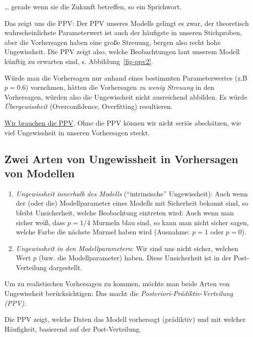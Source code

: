 \documentclass[
  a4paper,
  DIV=11]{scrreprt}
\theoremstyle{definition}
\theoremstyle{remark}
\begin{document}
\ldots{} gerade wenn sie die Zukunft betreffen, so ein Sprichwort.

Das zeigt uns die PPV: Der PPV unseres Modells gelingt es zwar, der
theoretisch wahrscheinlichste Parameterwert ist auch der häufigste in
unseren Stichproben, aber die Vorhersagen haben eine große Streuung,
bergen also recht hohe Ungewissheit. Die PPV zeigt also, welche
Beobachtungen laut unserem Modell künftig zu erwarten sind, s.
Abbildung~\ref{fig-ppv2}.

Würde man die Vorhersagen nur anhand eines bestimmten Parameterwertes
(z.B \(p=0.6\)) vornehmen, hätten die Vorhersagen \emph{zu wenig
Streuung} in den Vorhersagen, würden also die Ungewissheit nicht
ausreichend abbilden. Es würde \emph{Übergewissheit} (Overconfidence,
Overfitting) resultieren.

\href{https://imgflip.com/i/6zm1hh}{Wir brauchen die PPV}. Ohne die PPV
können wir nicht seriös abschätzen, wie viel Ungewissheit in unseren
Vorhersagen steckt.

\hypertarget{zwei-arten-von-ungewissheit-in-vorhersagen-von-modellen}{%
\subsection{Zwei Arten von Ungewissheit in Vorhersagen von
Modellen}\label{zwei-arten-von-ungewissheit-in-vorhersagen-von-modellen}}

\begin{enumerate}
\def\labelenumi{\arabic{enumi}.}
\item
  \emph{Ungewissheit innerhalb des Modells} (``intrinsische''
  Ungewissheit): Auch wenn der (oder die) Modellparameter eines Modells
  mit Sicherheit bekannt sind, so bleibt Unsicherheit, welche
  Beobachtung eintreten wird: Auch wenn man sicher weiß, dass \(p=1/4\)
  Murmeln blau sind, so kann man nicht sicher sagen, welche Farbe die
  nächste Murmel haben wird (Ausnahme: \(p=1\) oder \(p=0\)).
\item
  \emph{Ungewissheit in den Modellparametern}: Wir sind uns nicht
  sicher, welchen Wert \(p\) (bzw. die Modellparameter) haben. Diese
  Unsicherheit ist in der Post-Verteilung dargestellt.
\end{enumerate}

Um zu realistischen Vorhersagen zu kommen, möchte man beide Arten von
Ungewissheit berücksichtigen: Das macht die
\emph{Posteriori-Prädiktiv-Verteilung (PPV)}.

Die PPV zeigt, welche Daten das Modell vorhersagt (prädiktiv) und mit
welcher Häufigkeit, basierend auf der Post-Verteilung.
\end{document}
